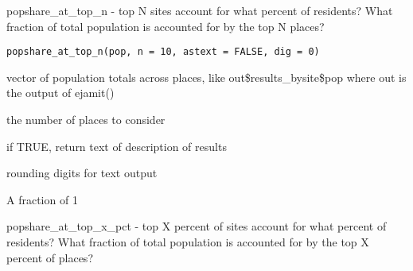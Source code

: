 \documentclass[a4paper]{book}
\begin{document}
%
\begin{Description}\relax
popshare\_at\_top\_n  - top N sites account for what percent of residents?
What fraction of total population is accounted for by the top N places?
\end{Description}
%
\begin{Usage}
\begin{verbatim}
popshare_at_top_n(pop, n = 10, astext = FALSE, dig = 0)
\end{verbatim}
\end{Usage}
%
\begin{Arguments}
\begin{ldescription}
\item[\code{pop}] vector of population totals across places,
like out\$results\_bysite\$pop where out is the output of ejamit()

\item[\code{n}] the number of places to consider

\item[\code{astext}] if TRUE, return text of description of results

\item[\code{dig}] rounding digits for text output
\end{ldescription}
\end{Arguments}
%
\begin{Value}
A fraction of 1
\end{Value}
%
\begin{Examples}
\end{Examples}
%
\begin{Description}\relax
popshare\_at\_top\_x\_pct  - top X percent of sites account for what percent of residents?
What fraction of total population is accounted for by the top X percent of places?
\end{Description}
\end{document}
